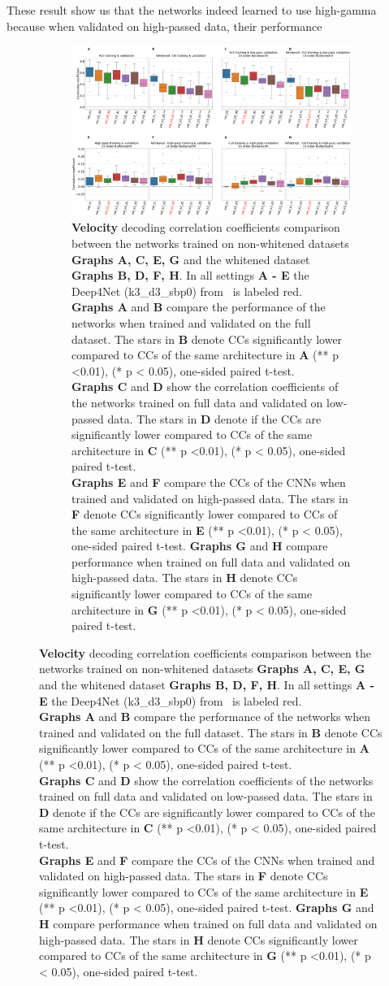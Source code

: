 These result show us that the networks indeed learned to use high-gamma because when validated on high-passed data, their performance 

\begin{figure}[!htbp]
\begin{subfigure}[a]{\textwidth}
   \includegraphics[width=1\linewidth]{img/ch4/vel-pw-vs-non-pw-performance}
   \caption{\textbf{Velocity} decoding correlation coefficients comparison between the networks trained on non-whitened datasets \textbf{Graphs A, C, E, G} and the whitened dataset \textbf{Graphs B, D, F, H}.
   In all settings \textbf{A - E} the Deep4Net (k3\_d3\_sbp0) from~\cite{Hammer-2021} is labeled red.
   \\ \textbf{Graphs A} and \textbf{B} compare the performance of the networks when trained and validated on the full dataset.
   The stars in \textbf{B} denote CCs significantly lower compared to CCs of the same architecture in \textbf{A} (** p <0.01), (* p < 0.05), one-sided paired t-test.
   \\\textbf{Graphs C} and \textbf{D} show the correlation coefficients of the networks trained on full data and validated on low-passed data.
   The stars in \textbf{D} denote if the CCs are significantly lower compared to CCs of the same architecture in \textbf{C} (** p <0.01), (* p < 0.05), one-sided paired t-test.
   \\\textbf{Graphs E} and \textbf{F} compare the CCs of the CNNs when trained and validated on high-passed data.
   The stars in \textbf{F} denote CCs significantly lower compared to CCs of the same architecture in \textbf{E} (** p <0.01), (* p < 0.05), one-sided paired t-test.
   \textbf{Graphs G} and \textbf{H} compare performance when trained on full data and validated on high-passed data.
   The stars in \textbf{H} denote CCs significantly lower compared to CCs of the same architecture in \textbf{G} (** p <0.01), (* p < 0.05), one-sided paired t-test.}
\end{subfigure}\label{fig:vel-pw-performance}
\end{figure}
\clearpage   

